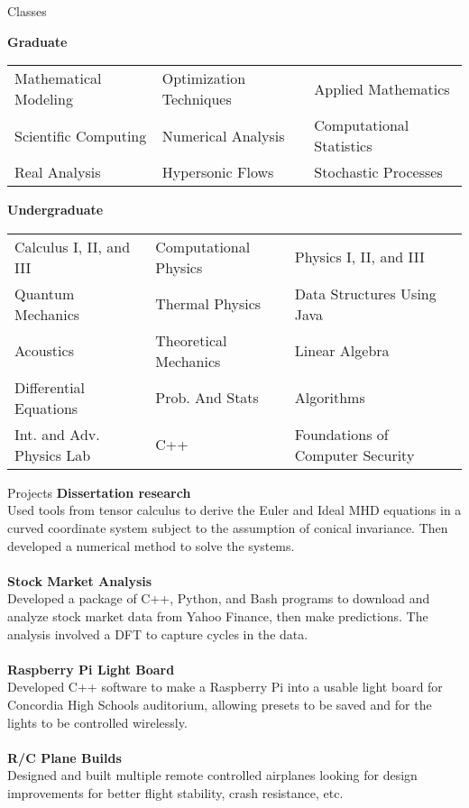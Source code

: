 \documentclass{resume} %
\begin{document}
\begin{rSection}{Classes}

{\bf Graduate}\\
\begin{tabular}{ m{15em} m{15em} m{15em} }
Mathematical Modeling & Optimization Techniques	& Applied Mathematics \\
Scientific Computing & Numerical Analysis & Computational Statistics \\
Real Analysis & Hypersonic Flows & Stochastic Processes\\
\end{tabular}

{\bf Undergraduate}\\
\begin{tabular}{ m{15em} m{15em} m{15em} }
Calculus I, II, and III & Computational Physics & Physics I, II, and III \\
Quantum Mechanics & Thermal Physics & Data Structures Using Java \\
Acoustics & Theoretical Mechanics & Linear Algebra \\
Differential Equations & Prob. And Stats & Algorithms \\
Int. and Adv. Physics Lab  & C++ & Foundations of Computer Security
\end{tabular}

\end{rSection}



\begin{rSection}{Projects}
{\bf Dissertation research}
\\Used tools from tensor calculus to derive the Euler and Ideal MHD equations in a curved coordinate system subject to the assumption of conical invariance. Then developed a numerical method to solve the systems. \\
\\{\bf Stock Market Analysis}\\
Developed a package of C++, Python, and Bash programs to download and analyze stock market data from Yahoo Finance, then make predictions. The analysis involved a DFT to capture cycles in the data.\\
\\{\bf Raspberry Pi Light Board}\\
Developed C++ software to make a Raspberry Pi into a usable light board for Concordia High School\textquotesingle s auditorium, allowing presets to be saved and for the lights to be controlled wirelessly.\\
\\{\bf R/C Plane Builds}\\
Designed and built multiple remote controlled airplanes looking for design improvements for better flight stability, crash resistance, etc.



\end{rSection}
\end{document}
